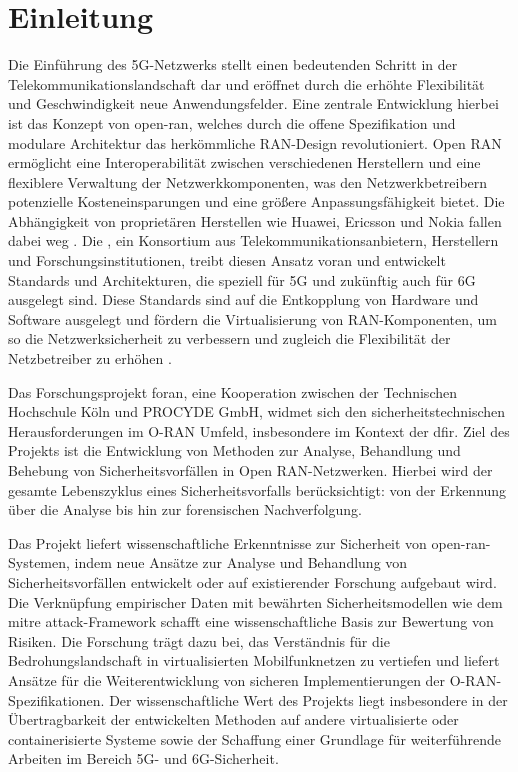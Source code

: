 \chapter{Einleitung}
\label{chap:Einleitung}

\par
Die Einführung des 5G-Netzwerks stellt einen bedeutenden Schritt in der Telekommunikationslandschaft dar und eröffnet durch die erhöhte Flexibilität und Geschwindigkeit neue Anwendungsfelder. Eine zentrale Entwicklung hierbei ist das Konzept von \gls{open-ran}, welches durch die offene Spezifikation und modulare Architektur das herkömmliche RAN-Design revolutioniert. Open RAN ermöglicht eine Interoperabilität zwischen verschiedenen Herstellern und eine flexiblere Verwaltung der Netzwerkkomponenten, was den Netzwerkbetreibern potenzielle Kosteneinsparungen und eine größere Anpassungsfähigkeit bietet. Die Abhängigkeit von proprietären Herstellen wie Huawei, Ericsson und Nokia fallen dabei weg \autocite{NokiaEricssonUnd}. Die \orana, ein Konsortium aus Telekommunikationsanbietern, Herstellern und Forschungsinstitutionen, treibt diesen Ansatz voran und entwickelt Standards und Architekturen, die speziell für 5G und zukünftig auch für 6G ausgelegt sind. Diese Standards sind auf die Entkopplung von Hardware und Software ausgelegt und fördern die Virtualisierung von RAN-Komponenten, um so die Netzwerksicherheit zu verbessern und zugleich die Flexibilität der Netzbetreiber zu erhöhen \autocite{5GFORAN}.
\par
Das Forschungsprojekt \gls{foran}, eine Kooperation zwischen der Technischen Hochschule Köln und PROCYDE GmbH, widmet sich den sicherheitstechnischen Herausforderungen im O-RAN Umfeld, insbesondere im Kontext der \gls{dfir}. Ziel des Projekts ist die Entwicklung von Methoden zur Analyse, Behandlung und Behebung von Sicherheitsvorfällen in Open RAN-Netzwerken. Hierbei wird der gesamte Lebenszyklus eines Sicherheitsvorfalls berücksichtigt: von der Erkennung über die Analyse bis hin zur forensischen Nachverfolgung.
\par Das Projekt liefert wissenschaftliche Erkenntnisse zur Sicherheit von \gls{open-ran}-Systemen, indem neue Ansätze zur Analyse und Behandlung von Sicherheitsvorfällen entwickelt oder auf existierender Forschung aufgebaut wird. Die Verknüpfung empirischer Daten mit bewährten Sicherheitsmodellen wie dem \gls{mitre} \gls{attack}-Framework schafft eine wissenschaftliche Basis zur Bewertung von Risiken. Die Forschung trägt dazu bei, das Verständnis für die Bedrohungslandschaft in virtualisierten Mobilfunknetzen zu vertiefen und liefert Ansätze für die Weiterentwicklung von sicheren Implementierungen der O-RAN-Spezifikationen. Der wissenschaftliche Wert des Projekts liegt insbesondere in der Übertragbarkeit der entwickelten Methoden auf andere virtualisierte oder containerisierte Systeme sowie der Schaffung einer Grundlage für weiterführende Arbeiten im Bereich 5G- und 6G-Sicherheit.
